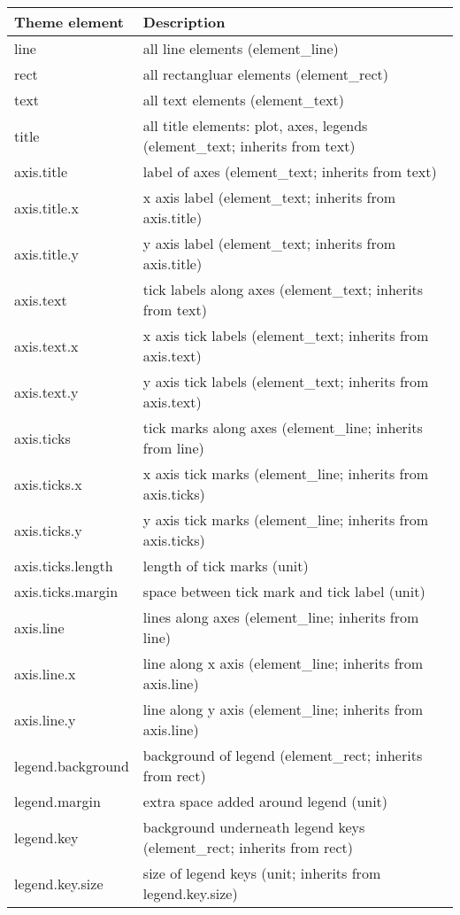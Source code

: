 \begin{table}[ht]
\centering
\begin{tabular}{ll}
  \hline
Theme element & Description \\ 
  \hline
line & all line elements (element\_line) \\ 
  rect & all rectangluar elements (element\_rect) \\ 
  text & all text elements (element\_text) \\ 
  title & all title elements: plot, axes, legends (element\_text; inherits from text) \\ 
  axis.title & label of axes (element\_text; inherits from text) \\ 
  axis.title.x & x axis label (element\_text; inherits from axis.title) \\ 
  axis.title.y & y axis label (element\_text; inherits from axis.title) \\ 
  axis.text & tick labels along axes (element\_text; inherits from text) \\ 
  axis.text.x & x axis tick labels (element\_text; inherits from axis.text) \\ 
  axis.text.y & y axis tick labels (element\_text; inherits from axis.text) \\ 
  axis.ticks & tick marks along axes (element\_line; inherits from line) \\ 
  axis.ticks.x & x axis tick marks (element\_line; inherits from axis.ticks) \\ 
  axis.ticks.y & y axis tick marks (element\_line; inherits from axis.ticks) \\ 
  axis.ticks.length & length of tick marks (unit) \\ 
  axis.ticks.margin & space between tick mark and tick label (unit) \\ 
  axis.line & lines along axes (element\_line; inherits from line) \\ 
  axis.line.x & line along x axis (element\_line; inherits from axis.line) \\ 
  axis.line.y & line along y axis (element\_line; inherits from axis.line) \\ 
  legend.background & background of legend (element\_rect; inherits from rect) \\ 
  legend.margin & extra space added around legend (unit) \\ 
  legend.key & background underneath legend keys (element\_rect; inherits from rect) \\ 
  legend.key.size & size of legend keys (unit; inherits from legend.key.size) \\ 

\end{tabular}
\end{table}
